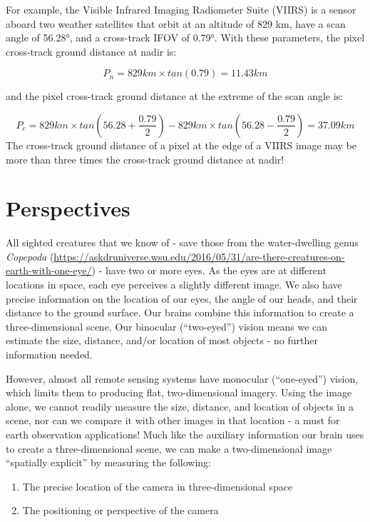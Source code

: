 \documentclass[
]{book}
\providecommand{\tightlist}{%
  \setlength{\itemsep}{0pt}\setlength{\parskip}{0pt}}
\begin{document}
For example, the Visible Infrared Imaging Radiometer Suite (VIIRS) is a sensor aboard two weather satellites that orbit at an altitude of 829 km, have a scan angle of 56.28°, and a cross-track IFOV of 0.79°. With these parameters, the pixel cross-track ground distance at nadir is:

\[
P_n = 829 km × tan(0.79) = 11.43 km
\]

and the pixel cross-track ground distance at the extreme of the scan angle is:

\[
P_c = 829 km × tan(56.28+\frac{0.79}{2}) - 829 km × tan(56.28-\frac{0.79}{2})=37.09km
\]
The cross-track ground distance of a pixel at the edge of a VIIRS image may be more than three times the cross-track ground distance at nadir!

\section{Perspectives}\label{perspectives}

All sighted creatures that we know of - save those from the water-dwelling genus \emph{Copepoda} (\url{https://askdruniverse.wsu.edu/2016/05/31/are-there-creatures-on-earth-with-one-eye/}) - have two or more eyes. As the eyes are at different locations in space, each eye perceives a slightly different image. We also have precise information on the location of our eyes, the angle of our heads, and their distance to the ground surface. Our brains combine this information to create a three-dimensional scene. Our binocular (``two-eyed'') vision means we can estimate the size, distance, and/or location of most objects - no further information needed.

However, almost all remote sensing systems have monocular (``one-eyed'') vision, which limits them to producing flat, two-dimensional imagery. Using the image alone, we cannot readily measure the size, distance, and location of objects in a scene, nor can we compare it with other images in that location - a must for earth observation applications! Much like the auxiliary information our brain uses to create a three-dimensional scene, we can make a two-dimensional image ``spatially explicit'' by measuring the following:

\begin{enumerate}
\def\labelenumi{\arabic{enumi}.}
\tightlist
\item
  The precise location of the camera in three-dimensional space
\item
  The positioning or perspective of the camera
\end{enumerate}
\end{document}
